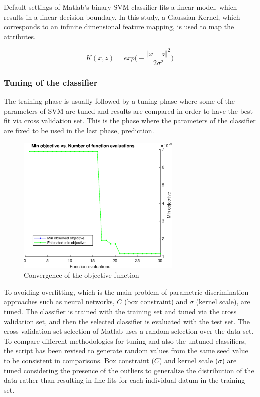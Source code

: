 Default settings of Matlab's binary SVM classifier fits a linear model, which results in a linear decision boundary.  
In this study, a Gaussian Kernel, which corresponds to an infinite dimensional feature mapping, is used to map the attributes.

\begin{equation}
K (x,z) = exp \bigg(-\frac{\Vert x - z \Vert ^ 2}{2 \sigma^2} \bigg)
\end{equation}


\subsubsection{Tuning of the classifier}

The training phase is usually followed by a tuning phase where some of the parameters of SVM are tuned and results are compared in order to have the best fit via cross validation set. This is the phase where the parameters of the classifier are fixed to be used in the last phase, prediction.

\begin{figure}
\begin{center}
\includegraphics[width=0.7\textwidth]{figures/objectiveFuncEval}    %
\caption{Convergence of the objective function} 
\label{fig:objectiveFuncEval}
\end{center}
\end{figure}

To avoiding overfitting, which is the main problem of parametric discrimination approaches such as neural networks, $C$ (box constraint) and $\sigma$ (kernel scale), are tuned.
The classifier is trained with the training set and tuned via the cross validation set, and then the selected classifier is evaluated with the test set. The cross-validation set selection of Matlab uses a random selection over the data set. 
To compare different methodologies for tuning and also the untuned classifiers, the script has been revised to generate random values from the same seed value to be consistent in comparisons.
Box constraint ($C$) and kernel scale ($\sigma$) are tuned considering the presence of the outliers to generalize the distribution of the data rather than resulting in fine fits for each individual datum in the training set. 

